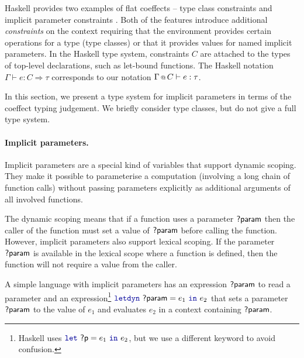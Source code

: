 Haskell provides two examples of flat coeffects -- type class constraints and implicit parameter 
constraints \cite{app-type-classes,app-implicit-parameters}. Both of the features introduce additional 
\emph{constraints} on the context requiring that the environment provides certain operations for
a type (type classes) or that it provides values for named implicit parameters.
In the Haskell type system, constraints $C$ are attached to the types of top-level declarations,
such as let-bound functions. The Haskell notation $\Gamma \vdash e : C \Rightarrow \tau$ 
corresponds to our notation $\Gamma \,\text{\scriptsize @}\, {{\text{$C$}}} \vdash e : \tau$. 

In this section, we present a type system for implicit parameters in terms of the coeffect typing
judgement. We briefly consider type classes, but do not give a full type system.

\paragraph{Implicit parameters.}
Implicit parameters are a special kind of variables that support dynamic scoping.
They make it possible to parameterise a computation (involving a long chain of function calls)
without passing parameters explicitly as additional arguments of all involved functions. 

The dynamic scoping means that if a function uses a parameter $\textnormal{\sffamily ?param}$ then the caller of the 
function must set a value of $\textnormal{\sffamily ?param}$ before calling the function. However, implicit 
parameters also support lexical scoping. If the parameter $\textnormal{\sffamily ?param}$ is available in the 
lexical scope where a function is defined, then the function will not require a value from the caller.

A simple language with implicit parameters has an expression $\textnormal{\sffamily ?param}$ to read a parameter 
and an expression\footnote{Haskell uses $\kvd{let}~\ident{?p} = e_1~\kvd{in}~e_2$, but we use a 
different keyword to avoid confusion.} $\kvd{letdyn}~\ident{?param} = e_1~\kvd{in}~e_2$ that sets a 
parameter $\textnormal{\sffamily ?param}$ to the value of $e_1$ and evaluates $e_2$ in a context containing 
$\textnormal{\sffamily ?param}$. 

